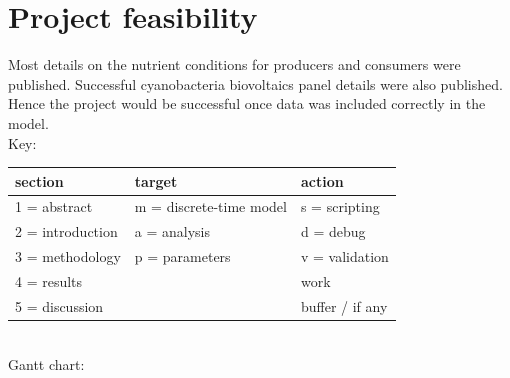 \documentclass[a4paper, 11pt]{article}
\begin{document}
\section{Project feasibility}
Most details on the nutrient conditions for producers\autocite{duarte2009microbial,markou2014microalgal} and consumers\autocite{neff1957purification,mooshammer2014stoichiometric} were published.  Successful cyanobacteria biovoltaics panel details were also published\autocite{mccormick2015biophotovoltaics}.  Hence the project would be successful once data was included correctly in the model.\\
Key:
\begin{tabular}{lll}
	section & target & action\\\hline
	1 = abstract & m = discrete-time model & s = scripting\\
	2 = introduction & a = analysis & d = debug\\
	3 = methodology & p = parameters & v = validation\\
	4 = results && \cellcolor{grey90}work\\
	5 = discussion && \cellcolor{lorange}buffer / if any\\
\end{tabular}\\
Gantt chart:\\
\end{document}
